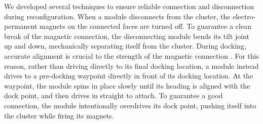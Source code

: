\documentclass[12pt]{article}
\begin{document}
We developed several techniques to ensure reliable connection and disconnection during reconfiguration.  
When a module disconnects from the cluster, the electro-permanent magnets on the connected faces are turned off.  To guarantee a clean break of the magnetic connection, the disconnecting module bends its tilt joint up and down, mechanically separating itself from the cluster. During docking, accurate alignment is crucial to the strength of the magnetic connection \cite{tosun2016design}.  For this reason, rather than driving directly to its final docking location, a module instead drives to a pre-docking waypoint directly in front of its docking location.  At the waypoint, the module spins in place slowly until its heading is aligned with the dock point, and then drives in straight to attach. To guarantee a good connection, the module intentionally overdrives its dock point, pushing itself into the cluster while firing its magnets.
%
\end{document}
